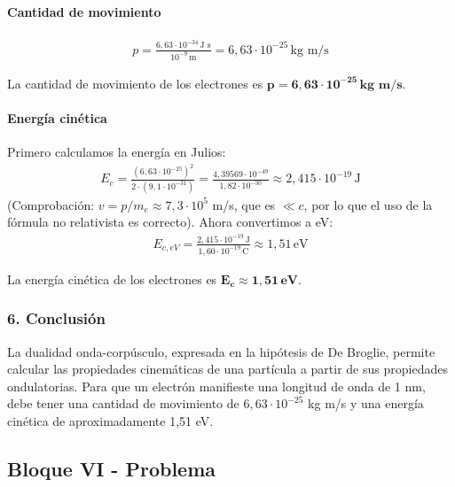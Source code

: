 \paragraph{Cantidad de movimiento}
\begin{gather}
    p = \frac{6,63 \cdot 10^{-34} \, \text{J s}}{10^{-9} \, \text{m}} = 6,63 \cdot 10^{-25} \, \text{kg m/s}
\end{gather}
\begin{cajaresultado}
    La cantidad de movimiento de los electrones es $\boldsymbol{p = 6,63 \cdot 10^{-25} \, \textbf{kg m/s}}$.
\end{cajaresultado}
\paragraph{Energía cinética}
Primero calculamos la energía en Julios:
\begin{gather}
    E_c = \frac{(6,63 \cdot 10^{-25})^2}{2 \cdot (9,1 \cdot 10^{-31})} = \frac{4,39569 \cdot 10^{-49}}{1,82 \cdot 10^{-30}} \approx 2,415 \cdot 10^{-19} \, \text{J}
\end{gather}
(Comprobación: $v = p/m_e \approx 7,3 \cdot 10^5$ m/s, que es $\ll c$, por lo que el uso de la fórmula no relativista es correcto).
Ahora convertimos a eV:
\begin{gather}
    E_{c,eV} = \frac{2,415 \cdot 10^{-19} \, \text{J}}{1,60 \cdot 10^{-19} \, \text{C}} \approx 1,51 \, \text{eV}
\end{gather}
\begin{cajaresultado}
    La energía cinética de los electrones es $\boldsymbol{E_c \approx 1,51 \, \textbf{eV}}$.
\end{cajaresultado}

\subsubsection*{6. Conclusión}
\begin{cajaconclusion}
La dualidad onda-corpúsculo, expresada en la hipótesis de De Broglie, permite calcular las propiedades cinemáticas de una partícula a partir de sus propiedades ondulatorias. Para que un electrón manifieste una longitud de onda de 1 nm, debe tener una cantidad de movimiento de $6,63 \cdot 10^{-25}$ kg m/s y una energía cinética de aproximadamente 1,51 eV.
\end{cajaconclusion}

\newpage
\subsection{Bloque VI - Problema}
\label{subsec:B6_2014_jun_ord}

